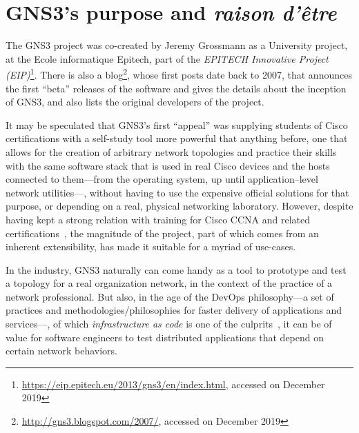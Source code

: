 \section{GNS3's purpose and \emph{raison d'être}}
\label{sec:gns3why}

The GNS3 project was co-created by Jeremy Grossmann as a University project, at the Ecole informatique Epitech, part of the \emph{EPITECH Innovative Project (EIP)}\footnote{\url{https://eip.epitech.eu/2013/gns3/en/index.html}, accessed on December 2019}.
There is also a blog\footnote{\url{http://gns3.blogspot.com/2007/}, accessed on December 2019}, whose first posts date back to 2007, that announces the first ``beta'' releases of the software and gives the details about the inception of GNS3, and also lists the original developers of the project.

It may be speculated that GNS3's first ``appeal'' was supplying students of Cisco certifications with a self-study tool more powerful that anything before, one that allows for the creation of arbitrary network topologies and practice their skills with the same software stack that is used in real Cisco devices and the hosts connected to them---from the operating system, up until application--level network utilities---, without having to use the expensive official solutions for that purpose, or depending on a real, physical networking laboratory.
However, despite having kept a strong relation with training for Cisco CCNA and related certifications~\cite{thebookofgns3,gns3netsimguide}, the magnitude of the project, part of which comes from an inherent extensibility, has made it suitable for a myriad of use-cases.

In the industry, GNS3 naturally can come handy as a tool to prototype and test a topology for a real organization network, in the context of the practice of a network professional.
But also, in the age of the DevOps philosophy---a set of practices and methodologies/philosophies for faster delivery of applications and services---, of which \emph{infrastructure as code} is one of the culprits~\cite{awswhatisdevops}, it can be of value for software engineers to test distributed applications that depend on certain network behaviors.

